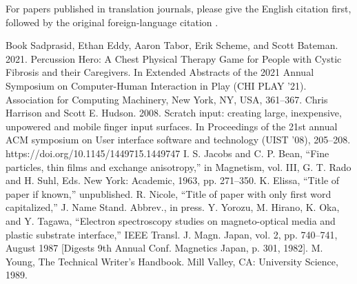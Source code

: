 \documentclass[conference]{IEEEtran}
\begin{document}
For papers published in translation journals, please give the English 
citation first, followed by the original foreign-language citation \cite{b6}.

\begin{thebibliography}{00}
 Book Sadprasid, Ethan Eddy, Aaron Tabor, Erik Scheme, and Scott Bateman. 2021. Percussion Hero: A Chest Physical Therapy Game for People with Cystic Fibrosis and their Caregivers. In Extended Abstracts of the 2021 Annual Symposium on Computer-Human Interaction in Play (CHI PLAY '21). Association for Computing Machinery, New York, NY, USA, 361–367.  
 Chris Harrison and Scott E. Hudson. 2008. Scratch input: creating large, inexpensive, unpowered and mobile finger input surfaces. In Proceedings of the 21st annual ACM symposium on User interface software and technology (UIST ’08), 205–208. https://doi.org/10.1145/1449715.1449747
 I. S. Jacobs and C. P. Bean, ``Fine particles, thin films and exchange anisotropy,'' in Magnetism, vol. III, G. T. Rado and H. Suhl, Eds. New York: Academic, 1963, pp. 271--350.
 K. Elissa, ``Title of paper if known,'' unpublished.
 R. Nicole, ``Title of paper with only first word capitalized,'' J. Name Stand. Abbrev., in press.
 Y. Yorozu, M. Hirano, K. Oka, and Y. Tagawa, ``Electron spectroscopy studies on magneto-optical media and plastic substrate interface,'' IEEE Transl. J. Magn. Japan, vol. 2, pp. 740--741, August 1987 [Digests 9th Annual Conf. Magnetics Japan, p. 301, 1982].
 M. Young, The Technical Writer's Handbook. Mill Valley, CA: University Science, 1989.
\end{thebibliography}
\end{document}
